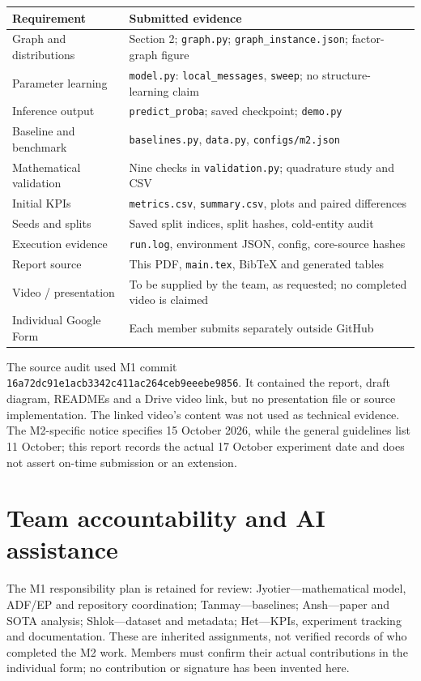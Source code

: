 \documentclass[11pt,a4paper]{article}
\newcommand{\code}[1]{\texttt{\small #1}}
\begin{document}
\begin{longtable}{@{}p{.28\linewidth}p{.67\linewidth}@{}}
\toprule Requirement & Submitted evidence\\\midrule\endhead
Graph and distributions & Section 2; \code{graph.py}; \code{graph\_instance.json}; factor-graph figure\\
Parameter learning & \code{model.py}: \code{local\_messages}, \code{sweep}; no structure-learning claim\\
Inference output & \code{predict\_proba}; saved checkpoint; \code{demo.py}\\
Baseline and benchmark & \code{baselines.py}, \code{data.py}, \code{configs/m2.json}\\
Mathematical validation & Nine checks in \code{validation.py}; quadrature study and CSV\\
Initial KPIs & \code{metrics.csv}, \code{summary.csv}, plots and paired differences\\
Seeds and splits & Saved split indices, split hashes, cold-entity audit\\
Execution evidence & \code{run.log}, environment JSON, config, core-source hashes\\
Report source & This PDF, \code{main.tex}, BibTeX and generated tables\\
Video / presentation & To be supplied by the team, as requested; no completed video is claimed\\
Individual Google Form & Each member submits separately outside GitHub\\\bottomrule
\end{longtable}

The source audit used M1 commit
\code{16a72dc91e1acb3342c411ac264ceb9eeebe9856}. It contained the report,
draft diagram, READMEs and a Drive video link, but no presentation file or source
implementation. The linked video's content was not used as technical evidence.
The M2-specific notice specifies 15 October 2026, while the general guidelines
list 11 October; this report records the actual 17 October experiment date and
does not assert on-time submission or an extension.

\section{Team accountability and AI assistance}
The M1 responsibility plan is retained for review: Jyotier---mathematical model,
ADF/EP and repository coordination; Tanmay---baselines; Ansh---paper and SOTA
analysis; Shlok---dataset and metadata; Het---KPIs, experiment tracking and
documentation. These are inherited assignments, not verified records of who
completed the M2 work. Members must confirm their actual contributions in the
individual form; no contribution or signature has been invented here.
\end{document}
